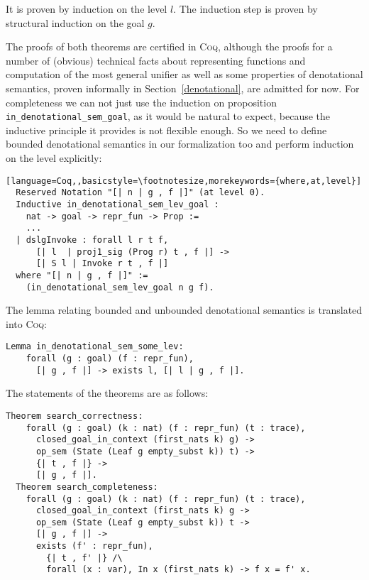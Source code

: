 It is proven by induction on the level $l$. The induction step is proven by structural induction on the goal $g$.

The proofs of both theorems are certified in \textsc{Coq}, although the proofs for a number of (obvious) technical facts about representing functions and computation of the most
general unifier as well as some properties of denotational semantics, proven informally in Section~\ref{denotational}, are
admitted for now. For completeness we can not just use the induction on proposition \lstinline|in_denotational_sem_goal|, as it would be natural to expect,
because the inductive principle it provides is not flexible enough. So we need to define bounded denotational semantics in our formalization too and perform
induction on the level explicitly:

\begin{lstlisting}[language=Coq,,basicstyle=\footnotesize,morekeywords={where,at,level}]
  Reserved Notation "[| n | g , f |]" (at level 0).
  Inductive in_denotational_sem_lev_goal :
    nat -> goal -> repr_fun -> Prop :=
    ...
  | dslgInvoke : forall l r t f,
      [| l  | proj1_sig (Prog r) t , f |] ->
      [| S l | Invoke r t , f |]
  where "[| n | g , f |]" :=
    (in_denotational_sem_lev_goal n g f).
\end{lstlisting}

The lemma relating bounded and unbounded denotational semantics is translated into \textsc{Coq}:

\begin{lstlisting}[language=Coq,basicstyle=\footnotesize]
  Lemma in_denotational_sem_some_lev:
    forall (g : goal) (f : repr_fun),
      [| g , f |] -> exists l, [| l | g , f |].
\end{lstlisting}

The statements of the theorems are as follows:

\begin{lstlisting}[language=Coq,basicstyle=\footnotesize]
  Theorem search_correctness:
    forall (g : goal) (k : nat) (f : repr_fun) (t : trace),
      closed_goal_in_context (first_nats k) g) ->
      op_sem (State (Leaf g empty_subst k)) t) ->
      {| t , f |} ->
      [| g , f |].
  Theorem search_completeness:
    forall (g : goal) (k : nat) (f : repr_fun) (t : trace),
      closed_goal_in_context (first_nats k) g ->
      op_sem (State (Leaf g empty_subst k)) t ->
      [| g , f |] ->
      exists (f' : repr_fun),
        {| t , f' |} /\
        forall (x : var), In x (first_nats k) -> f x = f' x.
\end{lstlisting}

